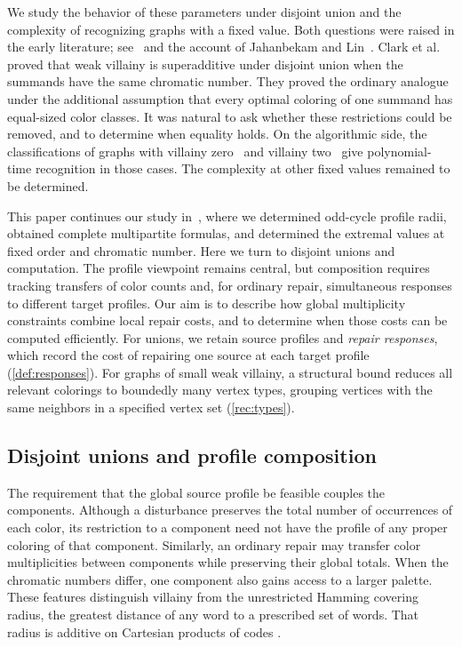 \documentclass[10pt,a4paper]{amsart}
\numberwithin{equation}{section}
\theoremstyle{definition}
\theoremstyle{remark}
\begin{document}
We study the behavior of these parameters under disjoint union and the
complexity of recognizing graphs with a fixed value. Both questions
were raised in the early literature; see~\cite{clark2006,west2006} and
the account of Jahanbekam and Lin~\cite{jahanbekam2021}. Clark et al.
proved that weak villainy is superadditive under disjoint union when
the summands have the same chromatic number. They proved the ordinary
analogue under the additional assumption that every optimal coloring
of one summand has equal-sized color classes. It was natural to ask
whether these restrictions could be removed, and to determine when
equality holds. On the algorithmic side, the classifications of graphs
with villainy zero~\cite{clark2006} and villainy
two~\cite{jahanbekam2021} give polynomial-time recognition in those
cases. The complexity at other fixed values remained to be determined.

This paper continues our study in~\cite{jiang2026exact}, where we
determined odd-cycle profile radii, obtained complete multipartite
formulas, and determined the extremal values at fixed order and
chromatic number. Here we turn to disjoint unions and computation.
The profile viewpoint remains central, but composition requires
tracking transfers of color counts and, for ordinary repair,
simultaneous responses to different target profiles.
Our aim is to describe how global multiplicity constraints combine
local repair costs, and to determine when those costs can be computed
efficiently. For unions, we retain source profiles and \emph{repair
responses}, which record the cost of repairing one source at each
target profile (\cref{def:responses}). For graphs of small weak
villainy, a structural bound reduces all relevant colorings to boundedly
many vertex types, grouping vertices with the same neighbors in a
specified vertex set (\cref{rec:types}).

\subsection{Disjoint unions and profile composition}

The requirement that the global source profile be feasible couples
the components.
Although a disturbance preserves the total number of occurrences of
each color, its restriction to a component need not have the profile
of any proper coloring of that component. Similarly, an ordinary
repair may transfer color multiplicities between components while
preserving their global totals. When the chromatic numbers differ,
one component also gains access to a larger palette. These features
distinguish villainy from the unrestricted Hamming covering radius,
the greatest distance of any word to a prescribed set of words.
That radius is additive on Cartesian products of codes
\cite[Section~II.C]{cohen1985}.
\end{document}
